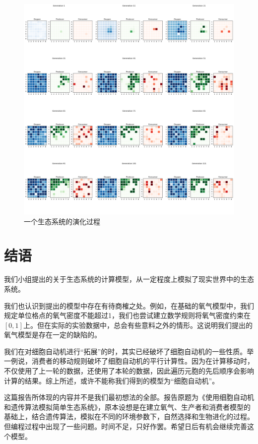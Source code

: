 \documentclass{ctexart}
\begin{document}
\begin{figure}[ht]
  \centering
  \includegraphics[width=\textwidth]{ecosystem.png}
  \caption{一个生态系统的演化过程}
  \label{fig:ecosystem}
\end{figure}

\section{结语}

我们小组提出的关于生态系统的计算模型，从一定程度上模拟了现实世界中的生态系统。

我们也认识到提出的模型中存在有待商榷之处。例如，在基础的氧气模型中，我们规定单位格点的氧气密度不能超过1，我们也尝试建立数学规则将氧气密度约束在$[0, 1]$上。但在实际的实验数据中，总会有些意料之外的情形。这说明我们提出的氧气模型是存在一定的缺陷的。

我们在对细胞自动机进行“拓展”的时，其实已经破坏了细胞自动机的一些性质。举一例说，消费者的移动规则破坏了细胞自动机的平行计算性。因为在计算移动时，不仅使用了上一轮的数据，还使用了本轮的数据，因此遍历元胞的先后顺序会影响计算的结果。综上所述，或许不能称我们得到的模型为“细胞自动机”。

这篇报告所体现的内容并不是我们最初想法的全部。报告原题为《使用细胞自动机和遗传算法模拟简单生态系统》，原本设想是在建立氧气、生产者和消费者模型的基础上，结合遗传算法，模拟在不同的环境参数下，自然选择和生物进化的过程。但编程过程中出现了一些问题。时间不足，只好作罢。希望日后有机会继续完善这个模型。
\end{document}
